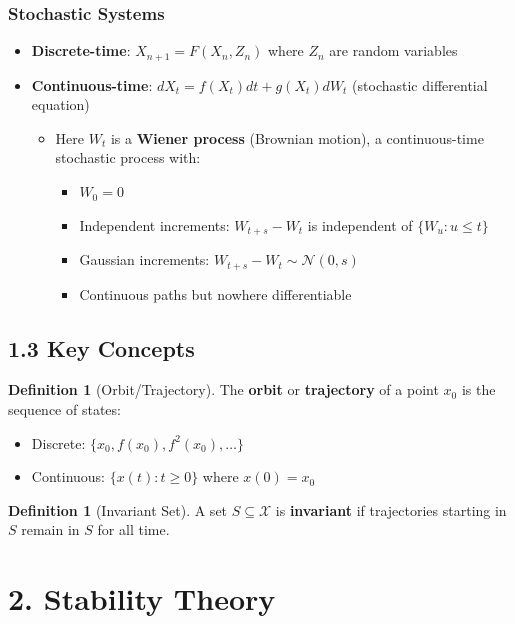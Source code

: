 \documentclass{amsart}
\theoremstyle{plain}
\theoremstyle{definition}
\newtheorem{definition}[theorem]{Definition}
\theoremstyle{remark}
\begin{document}
\subsubsection{Stochastic Systems}

\begin{itemize}
	\item \textbf{Discrete-time}: $X_{n+1} = F(X_n, Z_n)$ where $Z_n$ are random variables
	\item \textbf{Continuous-time}: $dX_t = f(X_t)dt + g(X_t)dW_t$ (stochastic differential equation)
	\begin{itemize}
		\item Here $W_t$ is a \textbf{Wiener process} (Brownian motion), a continuous-time stochastic process with:
		\begin{itemize}
			\item $W_0 = 0$
			\item Independent increments: $W_{t+s} - W_t$ is independent of $\{W_u : u \leq t\}$
			\item Gaussian increments: $W_{t+s} - W_t \sim \mathcal{N}(0, s)$
			\item Continuous paths but nowhere differentiable
		\end{itemize}
	\end{itemize}
\end{itemize}

\subsection{1.3 Key Concepts}

\begin{definition}[Orbit/Trajectory]
The \textbf{orbit} or \textbf{trajectory} of a point $x_0$ is the sequence of states:
	\begin{itemize}
		\item Discrete: $\{x_0, f(x_0), f^2(x_0), \ldots\}$
		\item Continuous: $\{x(t) : t \geq 0\}$ where $x(0) = x_0$
	\end{itemize}
\end{definition}
\begin{definition}[Invariant Set]
A set $S \subseteq \mathcal{X}$ is \textbf{invariant} if trajectories starting in $S$ remain in $S$ for all time.
\end{definition}
\section{2. Stability Theory}
\end{document}
